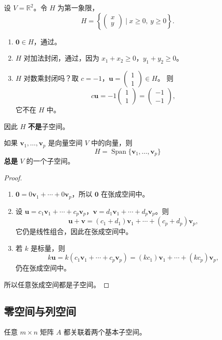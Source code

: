 \begin{example}[一个非子空间]
设 $V=\mathbb{R}^2$。令 $H$ 为第一象限，
\[
H=\left\{\begin{pmatrix}x\\y\end{pmatrix}\mid x\geq0,\ y\geq0\right\}.
\]
\begin{enumerate}
    \item $\mathbf{0}\in H$，通过。
    \item $H$ 对加法封闭，通过，因为 $x_1+x_2\geq0$，$y_1+y_2\geq0$。
    \item $H$ 对数乘封闭吗？取 $c=-1$，$\mathbf{u}=\begin{pmatrix}1\\1\end{pmatrix}\in H$。
    则
    \[
    c\mathbf{u}=-1\begin{pmatrix}1\\1\end{pmatrix}=\begin{pmatrix}-1\\-1\end{pmatrix},
    \]
    它不在 $H$ 中。
\end{enumerate}
因此 $H$ \textbf{不是}子空间。
\end{example}

\begin{theorem}
如果 $\mathbf{v}_1,\ldots,\mathbf{v}_p$ 是向量空间 $V$ 中的向量，则
\[
H=\operatorname{Span}\{\mathbf{v}_1,\ldots,\mathbf{v}_p\}
\]
\textbf{总是} $V$ 的一个子空间。
\end{theorem}
\begin{proof}
\begin{enumerate}
    \item $\mathbf{0}=0\mathbf{v}_1+\cdots+0\mathbf{v}_p$，所以 $\mathbf{0}$ 在张成空间中。
    \item 设 $\mathbf{u}=c_1\mathbf{v}_1+\cdots+c_p\mathbf{v}_p$，$\mathbf{v}=d_1\mathbf{v}_1+\cdots+d_p\mathbf{v}_p$。则
    \[
    \mathbf{u}+\mathbf{v}=(c_1+d_1)\mathbf{v}_1+\cdots+(c_p+d_p)\mathbf{v}_p,
    \]
    它仍是线性组合，因此在张成空间中。
    \item 若 $k$ 是标量，则
    \[
    k\mathbf{u}=k(c_1\mathbf{v}_1+\cdots+c_p\mathbf{v}_p)=(kc_1)\mathbf{v}_1+\cdots+(kc_p)\mathbf{v}_p,
    \]
    仍在张成空间中。
\end{enumerate}
所以任意张成空间都是子空间。
\end{proof}

\subsection{零空间与列空间}
任意 $m\times n$ 矩阵 $A$ 都关联着两个基本子空间。

